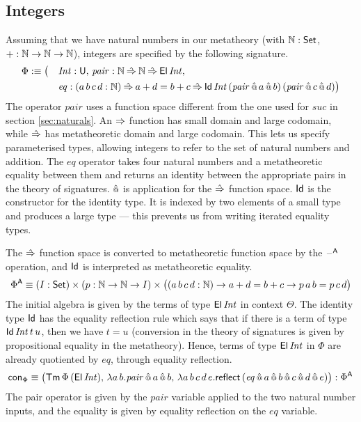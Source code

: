\documentclass[acmsmall,review,anonymous]{acmart}\settopmatter{printfolios=true,printccs=false,printacmref=false}
\begin{document}
\subsection{Integers}
\label{sec:integers}

Assuming that we have natural numbers in our metatheory (with $\mathbb{N} : \mathsf{Set}$,
$+ : \mathbb{N}\rightarrow\mathbb{N}\rightarrow\mathbb{N}$), integers are specified by the following signature.
\begin{alignat*}{5}
  & \Phi :\equiv \big( && \mathit{Int} : \mathsf{U},\, \mathit{pair} : \mathbb{N}\mathbin{\hat{\Rightarrow}}\mathbb{N}\mathbin{\hat{\Rightarrow}}\mathsf{El}\,\mathit{Int}, \\
  & && \mathit{eq}:(a\,b\,c\,d:\mathbb{N})\mathbin{\hat{\Rightarrow}} a+d=b+c \mathbin{\hat{\Rightarrow}}\mathsf{Id}\,\mathit{Int}\,(\mathit{pair}\mathop{\hat{\mathop{{\scriptstyle @}}}} a\mathop{\hat{\mathop{{\scriptstyle @}}}} b)\,(\mathit{pair}\mathop{\hat{\mathop{{\scriptstyle @}}}} c\mathop{\hat{\mathop{{\scriptstyle @}}}} d)\big)
\end{alignat*}
The operator $\mathit{pair}$ uses a function space different from the
one used for $\mathit{suc}$ in section \ref{sec:naturals}. An $\Rightarrow$
function has small domain and large codomain, while $\mathbin{\hat{\Rightarrow}}$ has
metatheoretic domain and large codomain. This lets us specify
parameterised types, allowing integers to refer to the set of natural
numbers and addition. The $\mathit{eq}$ operator takes four natural
numbers and a metatheoretic equality between them and returns an
identity between the appropriate pairs in the theory of
signatures. $\mathop{\hat{\mathop{{\scriptstyle @}}}}$ is application for the $\mathbin{\hat{\Rightarrow}}$ function
space. $\mathsf{Id}$ is the constructor for the identity type. It is indexed
by two elements of a small type and produces a large type --- this
prevents us from writing iterated equality types.

The $\mathbin{\hat{\Rightarrow}}$ function space is converted to metatheoretic function space
by the $\mathord{\hspace{1pt}\text{--}\hspace{1pt}}^{\mathsf{A}}$ operation, and $\mathsf{Id}$ is interpreted as metatheoretic
equality.
\[
\Phi^{\mathsf{A}} \equiv (I:\mathsf{Set})\times(p:\mathbb{N}\rightarrow\mathbb{N}\rightarrow I)\times\big((a\,b\,c\,d:\mathbb{N})\rightarrow a+d=b+c\rightarrow p\,a\,b=p\,c\,d\big)
\]
The initial algebra is given by the terms of type $\mathsf{El}\,\mathit{Int}$
in context $\Theta$. The identity type $\mathsf{Id}$ has the equality reflection
rule which says that if there is a term of type
$\mathsf{Id}\,\mathit{Int}\,t\,u$, then we have $t = u$ (conversion in the
theory of signatures is given by propositional equality in the
metatheory). Hence, terms of type $\mathsf{El}\,\mathit{Int}$ in $\Phi$ are
already quotiented by $\mathit{eq}$, through equality reflection.
\[
\mathsf{con}_\Phi \equiv \big(\mathsf{Tm}\,\Phi\,(\mathsf{El}\,\mathit{Int}),\, \lambda a\,b.\mathit{pair}\mathop{\hat{\mathop{{\scriptstyle @}}}} a\mathop{\hat{\mathop{{\scriptstyle @}}}} b,\, \lambda a\,b\,c\,d\,e.\mathsf{reflect}\,(\mathit{eq}\mathop{\hat{\mathop{{\scriptstyle @}}}} a\mathop{\hat{\mathop{{\scriptstyle @}}}} b\mathop{\hat{\mathop{{\scriptstyle @}}}} c\mathop{\hat{\mathop{{\scriptstyle @}}}} d\mathop{\hat{\mathop{{\scriptstyle @}}}} e)\big) : \Phi^{\mathsf{A}}
\]
The pair operator is given by the $\mathit{pair}$ variable applied
to the two natural number inputs, and the equality is given by
equality reflection on the $\mathit{eq}$ variable.
\end{document}

